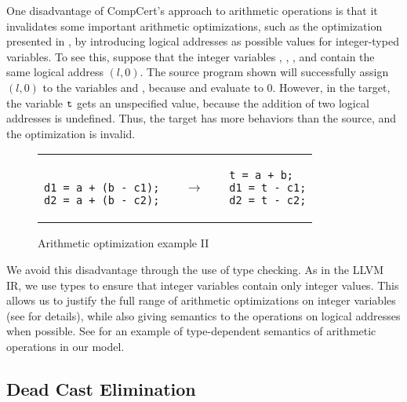 One disadvantage of CompCert's approach to arithmetic operations is that it invalidates some important arithmetic optimizations, such as the optimization presented in , by introducing logical addresses as possible values for integer-typed variables. 
To see this, suppose that the integer variables , , , and  contain the same logical address $(l,0)$. The source program shown will successfully assign $(l,0)$ to the variables  and , because  and  evaluate to $0$. However, in the target, the variable $\texttt{t}$ gets an unspecified value, because the addition of two logical addresses is undefined. Thus, the target has more behaviors than the source, and the optimization is invalid.

\begin{figure}[t]
\center
\begin{tabular}{lll}
\begin{minipage}{0.3\textwidth}
\begin{verbatim}

d1 = a + (b - c1);
d2 = a + (b - c2);
\end{verbatim}
\end{minipage}
&
$\quad\rightarrow\quad$
&
\begin{minipage}{0.3\textwidth}
\begin{verbatim}
t = a + b;
d1 = t - c1;
d2 = t - c2;
\end{verbatim}
\end{minipage}
\end{tabular}
\caption{Arithmetic optimization example II}\label{fig:intptrcast:formal-semantics:arith2}
\end{figure}

We avoid this disadvantage through the use of type checking. 
As in the LLVM IR, we use types to ensure that integer variables contain only integer values.
This allows us to justify the full range of arithmetic optimizations on integer variables (see  for details), 
while also giving semantics to the operations on logical addresses when possible.
See  for an example of type-dependent semantics of arithmetic operations in our model.

\subsection{Dead Cast Elimination}
\label{sec:intptrcast:formal-semantics:deadcast}

